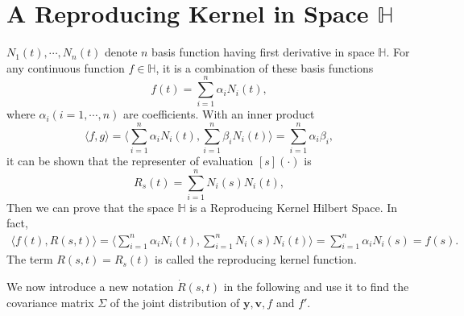 \section{A Reproducing Kernel in Space $\mathbb{H}$}\label{sectionRK}

$N_1(t), \cdots, N_n(t)$ denote $n$ basis function having first derivative in space $\mathbb{H}$. For any continuous function $f \in \mathbb{H}$, it is a combination of these basis functions
\begin{equation}
f(t)=\sum_{i=1}^{n} \alpha_iN_i(t),
\end{equation}
where $\alpha_i (i=1, \cdots, n)$ are coefficients. With an inner product
\begin{equation}\label{innerproduct}
\langle f,g\rangle= \langle\sum_{i=1}^{n} \alpha_iN_i(t), \sum_{i=1}^{n} \beta_iN_i(t)\rangle=\sum_{i=1}^{n} \alpha_i \beta_i, 
\end{equation}
it can be shown that the representer of evaluation $[s](\cdot)$ is
\begin{equation}\label{kernelfunction}
R_s(t) = \sum_{i=1}^{n} N_i(s)N_i(t),
\end{equation}
Then we can prove that the space $\mathbb{H}$ is a Reproducing Kernel Hilbert Space. In fact,
\begin{align}
\langle f(t), R(s,t)\rangle=\langle\sum_{i=1}^{n} \alpha_iN_i(t),  \sum_{i=1}^{n} N_i(s)N_i(t)\rangle=\sum_{i=1}^{n}\alpha_iN_i(s)=f(s).
\end{align}
The term $R(s,t)=R_s(t)$ is called the reproducing kernel function.


We now introduce a new notation $\dot{R}(s,t)$ in the following and use it to find the covariance matrix $\Sigma$ of the joint distribution of $\mathbf{y}, \mathbf{v}, f$ and $f'$.

